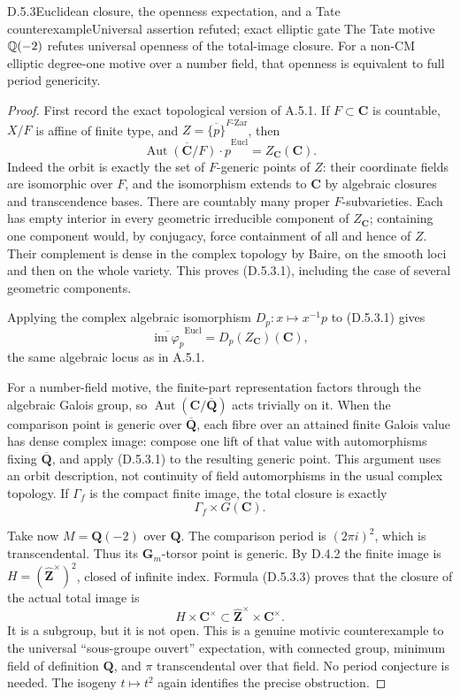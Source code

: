 \begin{result}{D.5.3}{Euclidean closure, the openness expectation, and a Tate counterexample}{Universal assertion refuted; exact elliptic gate}
The Tate motive $\mathbb Q(-2)$ refutes universal openness of the total-image closure. For a non-CM elliptic degree-one motive over a number field, that openness is equivalent to full period genericity.
\end{result}
\begin{proof}
First
record the exact topological version of A.5.1. If \(F\subset\mathbf C\)
is countable, \(X/F\) is affine of finite type, and
\(Z=\overline{\{p\}}^{F\text{-Zar}}\), then
\[
\overline{\operatorname{Aut}(\mathbf C/F)\cdot p}^{\mathrm{Eucl}}
=Z_{\mathbf C}(\mathbf C).
\tag{D.5.3.1}
\]
Indeed the orbit is exactly the set of \(F\)-generic points of
\(Z\): their coordinate fields are isomorphic over \(F\), and
the isomorphism extends to \(\mathbf C\) by algebraic closures
and transcendence bases. There are countably many proper
\(F\)-subvarieties. Each has empty interior in every geometric
irreducible component of \(Z_{\mathbf C}\); containing one
component would, by conjugacy, force containment of all and hence
of \(Z\). Their complement is dense in the complex topology by
Baire, on the smooth loci and then on the whole variety. This
proves (D.5.3.1), including the case of several geometric
components.

Applying the complex algebraic isomorphism
\(D_p:x\mapsto x^{-1}p\) to (D.5.3.1) gives
\[
\overline{\operatorname{im}\varphi_p}^{\mathrm{Eucl}}
=D_p(Z_{\mathbf C})(\mathbf C),
\tag{D.5.3.2}
\]
the same algebraic locus as in A.5.1.

For a number-field motive, the finite-part representation factors
through the algebraic Galois group, so
\(\operatorname{Aut}(\mathbf C/\overline{\mathbf Q})\) acts
trivially on it. When the comparison point is generic over
\(\overline{\mathbf Q}\), each fibre over an attained finite
Galois value has dense complex image: compose one lift of that
value with automorphisms fixing \(\overline{\mathbf Q}\), and
apply (D.5.3.1) to the resulting generic point. This argument
uses an orbit description, not continuity of field automorphisms
in the usual complex topology. If \(\Gamma_f\) is the compact
finite image, the total closure is exactly
\[
\Gamma_f\times G(\mathbf C).
\tag{D.5.3.3}
\]

Take now \(M=\mathbf Q(-2)\) over \(\mathbf Q\). The comparison
period is \((2\pi i)^2\), which is transcendental. Thus its
\(\mathbf G_m\)-torsor point is generic. By D.4.2 the finite
image is \(H=(\widehat{\mathbf Z}^\times)^2\), closed of
infinite index. Formula (D.5.3.3) proves that the closure of
the actual total image is
\[
H\times\mathbf C^\times
\subset\widehat{\mathbf Z}^\times\times\mathbf C^\times.
\tag{D.5.3.4}
\]
It is a subgroup, but it is not open. This is a genuine motivic
counterexample to the universal ``sous-groupe ouvert'' expectation,
with connected group, minimum field of definition \(\mathbf Q\),
and \(\pi\) transcendental over that field. No period conjecture
is needed. The isogeny \(t\mapsto t^2\) again identifies the
precise obstruction.


\end{proof}
